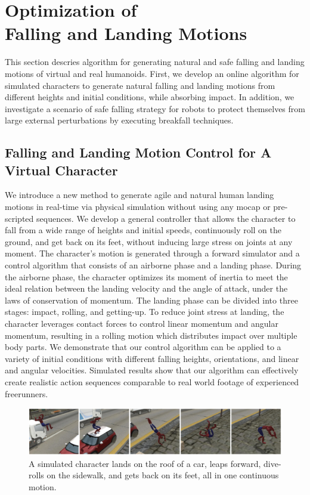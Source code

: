 \chapter{Optimization of \protect\\ Falling and Landing Motions}

This section descries algorithm for generating natural and safe
falling and landing motions of virtual and real humanoids.
First, we develop an online algorithm for simulated characters
to generate natural falling and landing motions from different 
heights and initial conditions, while absorbing impact.
In addition, we investigate a scenario of safe falling 
strategy for robots to protect themselves from large external 
perturbations by executing breakfall techniques.

\section{Falling and Landing Motion Control for A Virtual Character}

We introduce a new method to generate agile and natural human landing
motions in real-time via physical simulation without using any mocap
or pre-scripted sequences. We develop a general controller that allows
the character to fall from a wide range of heights and initial speeds,
continuously roll on the ground, and get back on its feet, without
inducing large stress on joints at any moment. The character's motion
is generated through a forward simulator and a control algorithm that
consists of an airborne phase and a landing phase. During the airborne
phase, the character optimizes its moment of inertia to meet the ideal
relation between the landing velocity and the angle of attack, under
the laws of conservation of momentum. The landing phase can be divided
into three stages: impact, rolling, and getting-up. To reduce joint
stress at landing, the character leverages contact forces to control
linear momentum and angular momentum, resulting in a rolling motion
which distributes impact over multiple body parts. We demonstrate that
our control algorithm can be applied to a variety of initial
conditions with different falling heights, orientations, and linear
and angular velocities. Simulated results show that our algorithm can
effectively create realistic action sequences comparable to real world
footage of experienced freerunners.

\begin{figure}[htbp]
\center
  \includegraphics[width=\linewidth]{images/falling1_teaser}
  \caption{A simulated character lands on the roof of a car, 
    leaps forward, dive-rolls on the sidewalk, 
    and gets back on its feet, all in one continuous motion.}
 \label{fig:landingOverview}
\end{figure}


